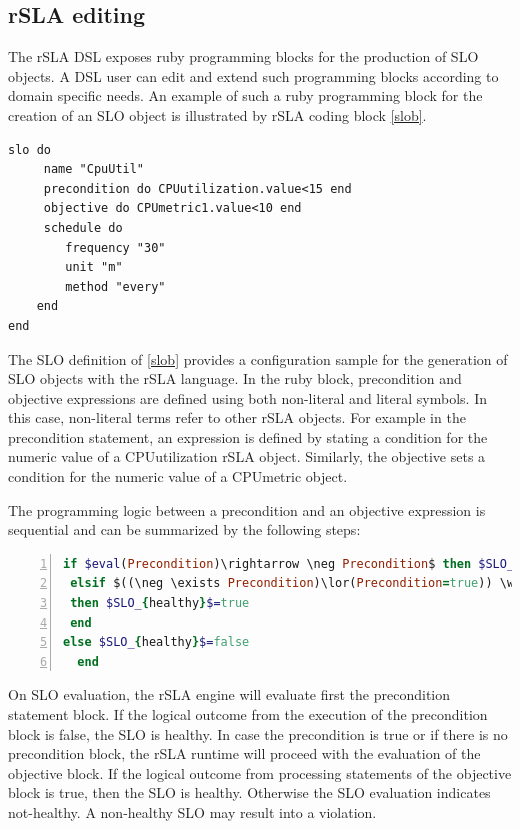 \subsection{rSLA editing}\label{editing}

The rSLA DSL exposes ruby programming blocks for the production of SLO objects. A DSL user can edit and extend such programming blocks according to domain specific needs. An example of such a ruby programming block for the creation of an SLO object is illustrated by rSLA coding block \ref{slob}.
\begin{lstlisting}[caption=SLO definition, label=slob]
slo do
     name "CpuUtil"
     precondition do CPUutilization.value<15 end
     objective do CPUmetric1.value<10 end
     schedule do
      	frequency "30"
    	unit "m"
    	method "every"
    end
end	
\end{lstlisting}

The SLO definition of \ref{slob} provides a configuration sample for the generation of SLO objects with the rSLA language. In the ruby block, precondition and objective expressions are defined using both non-literal and literal symbols. In this case, non-literal terms refer to other rSLA objects. For example in the precondition statement, an expression is defined by stating a condition for the numeric value of a CPUutilization rSLA object. Similarly, the objective sets a condition for the numeric value of a CPUmetric object.

The programming logic between a precondition and an objective expression is sequential and can be summarized by the following steps:

\begin{lstlisting}[language=Ruby, basicstyle=\small\normalfont\sffamily, breaklines=true,  captionpos=b, mathescape=true, caption=rSLA SLO precondition-objective logic, label=ifelse, numbers=left, numbersep=5pt, numberstyle=\tiny]
if $eval(Precondition)\rightarrow \neg Precondition$ then $SLO_{healthy}$ = true
 elsif $((\neg \exists Precondition)\lor(Precondition=true)) \wedge eval(Objective) \rightarrow$ true
 then $SLO_{healthy}$=true 
 end
else $SLO_{healthy}$=false
  end
\end{lstlisting}

On SLO evaluation, the rSLA engine will evaluate first the precondition statement block. If the logical outcome from the execution of the precondition block is false, the SLO is healthy. In case the precondition is true or if there is no precondition block, the rSLA runtime will proceed with the evaluation of the objective block. If the logical outcome from processing statements of the objective block is true, then the SLO is healthy. Otherwise the SLO evaluation indicates not-healthy. A non-healthy SLO may result into a violation.